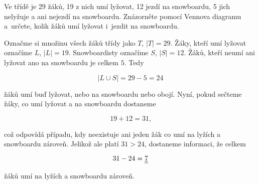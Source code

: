 \begin{questions}
    \question[2]
        Ve třídě je 29 žáků, 19 z nich umí lyžovat, 12 jezdí na snowboardu, 5 jich nelyžuje a ani nejezdí na snowboardu. 
        Znázorněte pomocí Vennova diagramu a~určete, kolik žáků umí lyžovat i~jezdit na snowboardu.

        \begin{solution}[20cm]
            Označme si množinu všech žáků třídy jako $T$, $|T| = 29$. Žáky, kteří umí lyžovat označíme $L$, $|L| = 19$. 
            Snowboardisty označíme $S$, $|S| = 12$. Žáků, kteří neumí ani lyžovat ano na snowboardu je celkem $5$. Tedy 
                
                $$ |L \displaystyle \cup S| = 29 - 5 = 24 $$

            žáků umí buď lyžovat, nebo na snowboardu nebo obojí. Nyní, pokud sečteme žáky, co umí lyžovat a na snowboardu
            dostaneme 
                
                $$ 19 + 12 = 31\text{,} $$
            
            což odpovídá případu, kdy neexistuje ani jeden žák co umí na lyžích a snowboardu zároveň. Jelikož ale platí $31 > 24$,
            dostaneme informaci, že celkem 
                
                $$ 31 - 24 = \underline{\underline{7}} $$
            
            žáků umí na lyžích a snowboardu zároveň.


        \end{solution}        

\end{questions}

